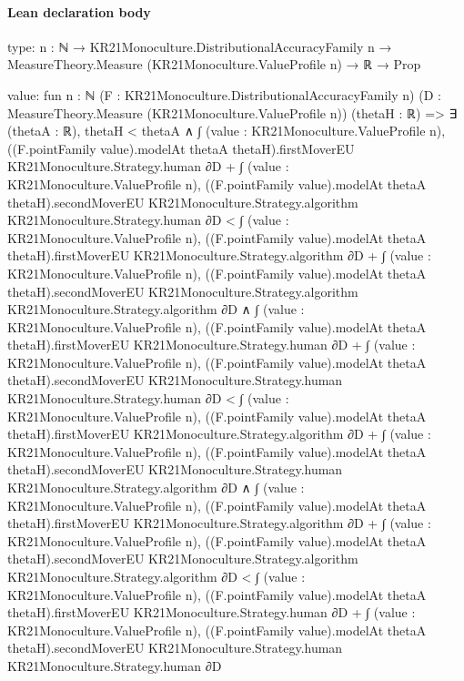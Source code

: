 \documentclass[10pt]{article}
\begin{document}
\paragraph{Lean declaration body}
\begin{ReviewVerbatim}
type:
{n : ℕ} →
  KR21Monoculture.DistributionalAccuracyFamily n → MeasureTheory.Measure (KR21Monoculture.ValueProfile n) → ℝ → Prop

value:
fun {n : ℕ} (F : KR21Monoculture.DistributionalAccuracyFamily n)
    (D : MeasureTheory.Measure (KR21Monoculture.ValueProfile n)) (thetaH : ℝ) =>
  ∃ (thetaA : ℝ),
    thetaH < thetaA ∧
      ∫ (value : KR21Monoculture.ValueProfile n),
              ((F.pointFamily value).modelAt thetaA thetaH).firstMoverEU KR21Monoculture.Strategy.human ∂D +
            ∫ (value : KR21Monoculture.ValueProfile n),
              ((F.pointFamily value).modelAt thetaA thetaH).secondMoverEU KR21Monoculture.Strategy.algorithm
                KR21Monoculture.Strategy.human ∂D <
          ∫ (value : KR21Monoculture.ValueProfile n),
              ((F.pointFamily value).modelAt thetaA thetaH).firstMoverEU KR21Monoculture.Strategy.algorithm ∂D +
            ∫ (value : KR21Monoculture.ValueProfile n),
              ((F.pointFamily value).modelAt thetaA thetaH).secondMoverEU KR21Monoculture.Strategy.algorithm
                KR21Monoculture.Strategy.algorithm ∂D ∧
        ∫ (value : KR21Monoculture.ValueProfile n),
                ((F.pointFamily value).modelAt thetaA thetaH).firstMoverEU KR21Monoculture.Strategy.human ∂D +
              ∫ (value : KR21Monoculture.ValueProfile n),
                ((F.pointFamily value).modelAt thetaA thetaH).secondMoverEU KR21Monoculture.Strategy.human
                  KR21Monoculture.Strategy.human ∂D <
            ∫ (value : KR21Monoculture.ValueProfile n),
                ((F.pointFamily value).modelAt thetaA thetaH).firstMoverEU KR21Monoculture.Strategy.algorithm ∂D +
              ∫ (value : KR21Monoculture.ValueProfile n),
                ((F.pointFamily value).modelAt thetaA thetaH).secondMoverEU KR21Monoculture.Strategy.human
                  KR21Monoculture.Strategy.algorithm ∂D ∧
          ∫ (value : KR21Monoculture.ValueProfile n),
                ((F.pointFamily value).modelAt thetaA thetaH).firstMoverEU KR21Monoculture.Strategy.algorithm ∂D +
              ∫ (value : KR21Monoculture.ValueProfile n),
                ((F.pointFamily value).modelAt thetaA thetaH).secondMoverEU KR21Monoculture.Strategy.algorithm
                  KR21Monoculture.Strategy.algorithm ∂D <
            ∫ (value : KR21Monoculture.ValueProfile n),
                ((F.pointFamily value).modelAt thetaA thetaH).firstMoverEU KR21Monoculture.Strategy.human ∂D +
              ∫ (value : KR21Monoculture.ValueProfile n),
                ((F.pointFamily value).modelAt thetaA thetaH).secondMoverEU KR21Monoculture.Strategy.human
                  KR21Monoculture.Strategy.human ∂D
\end{ReviewVerbatim}
\end{document}
